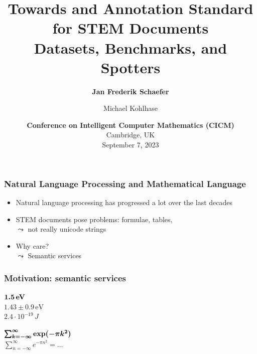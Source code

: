 \documentclass[aspectratio=169]{beamer}
\title{Towards and Annotation Standard for STEM Documents \\\large Datasets, Benchmarks, and Spotters}
\author{\textbf{Jan Frederik Schaefer} \and Michael Kohlhase}
\institute{FAU Erlangen-N\"urnberg/KWARC}
\date{\textbf{Conference on Intelligent Computer Mathematics (CICM)}\\Cambridge, UK\\September 7, 2023}
\begin{document}
\frame\titlepage


\begin{frame}
    \frametitle{Natural Language Processing and Mathematical Language}
    \begin{itemize}
        \item Natural language processing has progressed a lot over the last decades
        \item STEM documents pose problems:
            formulae, tables, \textellipsis\\
            $\leadsto$ not really unicode strings
        \item Why care?\\
            $\leadsto$ Semantic services
    \end{itemize}
\end{frame}


\begin{frame}
    \frametitle{Motivation: semantic services}
    \faSearch\;\; $\bm{1.5\,\text{\bf eV}}$
    \\[1em]
        \quad\quad\faExternalLink\;\; $1.43 \pm 0.9\,\text{eV}$\\[1em]
        \quad\quad\faExternalLink\;\; $2.4 \cdot 10^{-19}\,J$

    \vspace{3em}
    \faSearch\;\; $\bm{\sum_{k=-\infty}^\infty \text{\bf exp}(-\pi k^2)}$
    \\[1em]
        \quad\quad\faExternalLink\;\; $\sum_{n=-\infty}^\infty e^{-\pi n^2} = \ldots$
\end{frame}
\end{document}
